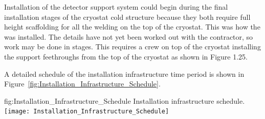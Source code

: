 Installation of the detector support system could begin during the final installation stages of the cryostat cold structure because they both require full height scaffolding for all the welding on the top of the cryostat. This was how the   was installed. The details have not yet been worked out with the contractor, so work may be done in stages. This requires a crew on top of the cryostat installing the  support feethroughs from the top of the cryostat as shown in Figure 1.25. 

A detailed schedule of the installation infrastructure time period is shown in Figure~\ref{fig:Installation_Infrastructure_Schedule}.
    
\begin{dunefigure}
{fig:Installation_Infrastructure_Schedule}
    {Installation infrastructure schedule.}
\texttt{[image: Installation\_Infrastructure\_Schedule]} 
\end{dunefigure}


\clearpage
